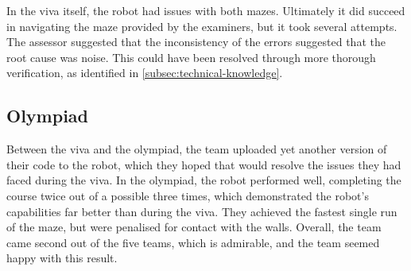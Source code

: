         In the viva itself, the robot had issues with both mazes.
        Ultimately it did succeed in navigating the maze provided by the examiners, but it took several attempts.
        The assessor suggested that the inconsistency of the errors suggested that the root cause was noise.
        This could have been resolved through more thorough verification, as identified in \autoref{subsec:technical-knowledge}.

    \subsection{Olympiad}\label{subsec:viva-olympiad}
        Between the viva and the olympiad, the team uploaded yet another version of their code to the robot, which they hoped that would resolve the issues they had faced during the viva.
        In the olympiad, the robot performed well, completing the course twice out of a possible three times, which demonstrated the robot's capabilities far better than during the viva.
        They achieved the fastest single run of the maze, but were penalised for contact with the walls.
        Overall, the team came second out of the five teams, which is admirable, and the team seemed happy with this result.